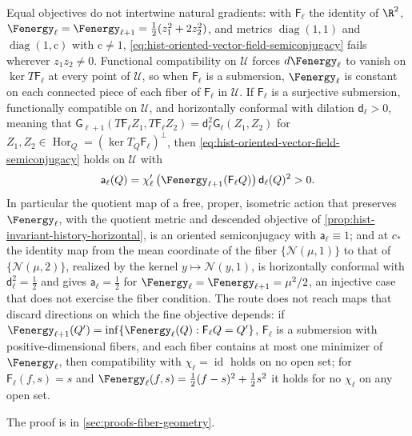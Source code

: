 Equal objectives do not intertwine natural gradients: with $\mathsf F_\ell$ the identity
of $\R^2$, $\Fenergy_\ell=\Fenergy_{\ell+1}=\tfrac12(z_1^2+2z_2^2)$, and metrics
$\operatorname{diag}(1,1)$ and $\operatorname{diag}(1,\mathrm c)$ with $\mathrm c\ne1$,
\eqref{eq:hist-oriented-vector-field-semiconjugacy} fails wherever $z_1z_2\ne0$.
Functional compatibility on $\mathcal U$ forces $d\Fenergy_\ell$ to vanish on
$\ker T\mathsf F_\ell$ at every point of $\mathcal U$, so when $\mathsf F_\ell$ is a
submersion, $\Fenergy_\ell$ is constant on each connected piece of each fiber of
$\mathsf F_\ell$ in $\mathcal U$.  If $\mathsf F_\ell$ is a surjective submersion,
functionally compatible on $\mathcal U$, and horizontally conformal with dilation
$\mathsf d_\ell>0$, meaning that
$\mathsf G_{\ell+1}(T\mathsf F_\ell Z_1,T\mathsf F_\ell Z_2)=\mathsf d_\ell^2\mathsf
G_\ell(Z_1,Z_2)$ for $Z_1,Z_2\in\operatorname{Hor}_Q=(\ker T_Q\mathsf F_\ell)^\perp$, then
\eqref{eq:hist-oriented-vector-field-semiconjugacy} holds on $\mathcal U$ with
\begin{equation}
\mathsf a_\ell(Q)
=\chi_\ell'\left(\Fenergy_{\ell+1}(\mathsf F_\ell Q)\right)
\mathsf d_\ell(Q)^2>0 .
\label{eq:hist-conformal-semiconjugacy-factor}
\end{equation}
In particular the quotient map of a free, proper, isometric action that preserves
$\Fenergy_\ell$, with the quotient metric and descended objective of
\cref{prop:hist-invariant-history-horizontal}, is an oriented semiconjugacy with
$\mathsf a_\ell\equiv1$; and at $c_*$ the identity map from the mean coordinate of the
fiber $\{\mathcal N(\mu,1)\}$ to that of $\{\mathcal N(\mu,2)\}$, realized by the kernel
$y\mapsto\mathcal N(y,1)$, is horizontally conformal with $\mathsf d_\ell^2=\tfrac12$ and
gives $\mathsf a_\ell=\tfrac12$ for $\Fenergy_\ell=\Fenergy_{\ell+1}=\mu^2/2$, an
injective case that does not exercise the fiber condition.  The route does not reach
maps that discard directions on which the fine objective depends: if
$\Fenergy_{\ell+1}(Q')=\inf\{\Fenergy_\ell(Q):\mathsf F_\ell Q=Q'\}$, $\mathsf F_\ell$ is
a submersion with positive-dimensional fibers, and each fiber contains at most one
minimizer of $\Fenergy_\ell$, then compatibility with $\chi_\ell=\operatorname{id}$ holds
on no open set; for $\mathsf F_\ell(f,s)=s$ and
$\Fenergy_\ell(f,s)=\tfrac12(f-s)^2+\tfrac12s^2$ it holds for no $\chi_\ell$ on any open
set.  

The proof is in \cref{sec:proofs-fiber-geometry}.

